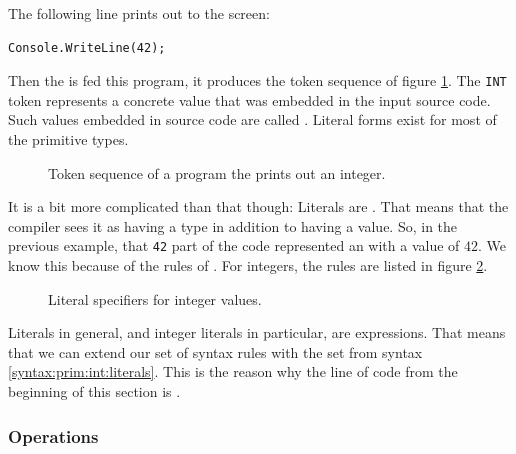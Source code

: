 The following line prints out  to the screen:
\begin{verbatim}
Console.WriteLine(42);
\end{verbatim}

Then the  is fed this program, it produces the token sequence of figure \ref{fig:primitives:int:tokens}. The \texttt{INT} token represents a concrete  value that was embedded in the input source code. Such values embedded in source code are called . Literal forms exist for most of the primitive types.

\begin{figure}[tbp]
  
  \caption{Token sequence of a program the prints out an integer.}
  \label{fig:primitives:int:tokens}
\end{figure}

It is a bit more complicated than that though: Literals are . That means that the compiler sees it as having a type in addition to having a value. So, in the previous example, that \texttt{42} part of the code represented an  with a value of $42$. We know this because of the  rules of \csharp. For integers, the rules are listed in figure \ref{fig:primitives:int:literals}.

\begin{figure}[tbp]
  
  \caption{Literal specifiers for integer values.}
  \label{fig:primitives:int:literals}
\end{figure}

Literals in general, and integer literals in particular, are expressions. That means that we can extend our set of syntax rules with the set from syntax \ref{syntax:prim:int:literals}. This is the reason why the line of code from the beginning of this section is .

\begin{syntaxfloat}
  
  \caption{Expressions of integer literals}
  \label{syntax:prim:int:literals}
\end{syntaxfloat}

\subsubsection{Operations}


